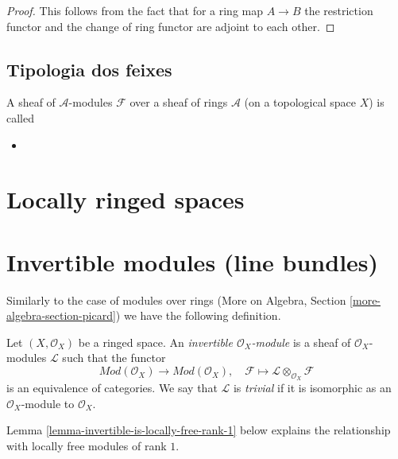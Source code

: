 \begin{proof}
This follows from the fact that for a ring map
$A \to B$ the restriction functor and the change
of ring functor are adjoint to each other.
\end{proof}

\subsection{Tipologia dos feixes}
\label{subsection-tipologia-dos-feixes}

\begin{definition}
\label{definition-tipologia-dos-feixes}
A sheaf of $\mathcal{A}$-modules $\mathcal{F}$ over a sheaf of rings 
$\mathcal{A}$ (on a topological space $X$) is called
\begin{itemize}
\item 
\end{itemize}
\end{definition}


\section{Locally ringed spaces}
\label{section-locally-ringed-spaces}

\section{Invertible modules (line bundles)}
\label{section-invertible}

\noindent
Similarly to the case of modules over rings
(More on Algebra, Section \ref{more-algebra-section-picard})
we have the following definition.

\begin{definition}
\label{definition-invertible}
Let $(X, \mathcal{O}_X)$ be a ringed space. An
{\it invertible $\mathcal{O}_X$-module} is a sheaf
of $\mathcal{O}_X$-modules $\mathcal{L}$ such that
the functor
$$
\textit{Mod}(\mathcal{O}_X) \longrightarrow \textit{Mod}(\mathcal{O}_X),\quad
\mathcal{F} \longmapsto \mathcal{L} \otimes_{\mathcal{O}_X} \mathcal{F}
$$
is an equivalence of categories. We say that $\mathcal{L}$ is
{\it trivial} if it is isomorphic as an $\mathcal{O}_X$-module
to $\mathcal{O}_X$.
\end{definition}

\noindent
Lemma \ref{lemma-invertible-is-locally-free-rank-1}
below explains the relationship with locally free modules
of rank $1$.

